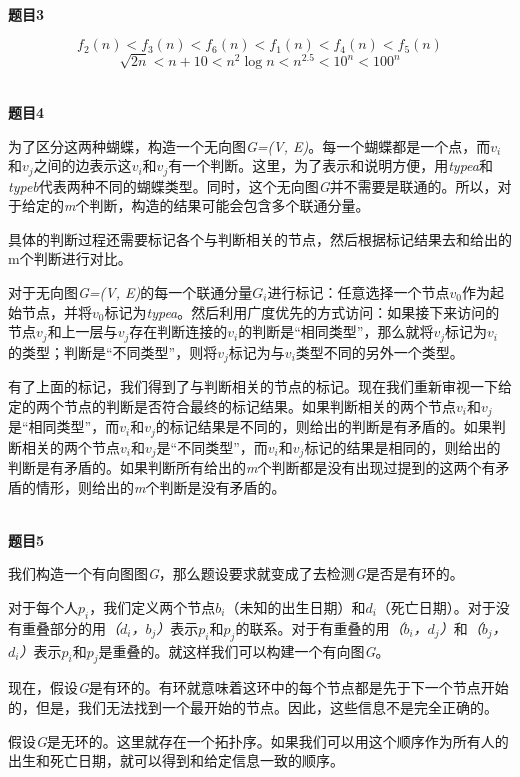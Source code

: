 \documentclass[a4paper,11pt,UTF8]{ctexart}
\begin{document}
\begin{spacing}{1.2}
~\\

\setlength{\parindent}{0em}
\textbf{\large{题目3}}
\setlength{\parindent}{2em}


$$f_2(n) < f_3(n) < f_6(n) < f_1(n) < f_4(n) < f_5(n)$$
$$ \sqrt{2n} < n + 10 < n^2 \log n < n^{2.5} < 10^n < 100^n $$


~\\
\setlength{\parindent}{0em}
\textbf{\large{题目4}}
\setlength{\parindent}{2em}

为了区分这两种蝴蝶，构造一个无向图\textit{G=(V, E)}。每一个蝴蝶都是一个点，而$v_i$和$v_j$之间的边表示这$v_i$和$v_j$有一个判断。这里，为了表示和说明方便，用\textit{typea}和\textit{typeb}代表两种不同的蝴蝶类型。同时，这个无向图\textit{G}并不需要是联通的。所以，对于给定的\textit{m}个判断，构造的结果可能会包含多个联通分量。

	具体的判断过程还需要标记各个与判断相关的节点，然后根据标记结果去和给出的m个判断进行对比。

	对于无向图\textit{G=(V, E)}的每一个联通分量$G_i$进行标记：任意选择一个节点$v_0$作为起始节点，并将$v_0$标记为\textit{typea}。然后利用广度优先的方式访问：如果接下来访问的节点$v_j$和上一层与$v_j$存在判断连接的$v_i$的判断是“相同类型”，那么就将$v_j$标记为$v_i$的类型；判断是“不同类型”，则将$v_j$标记为与$v_i$类型不同的另外一个类型。

	有了上面的标记，我们得到了与判断相关的节点的标记。现在我们重新审视一下给定的两个节点的判断是否符合最终的标记结果。如果判断相关的两个节点$v_i$和$v_j$是“相同类型”，而$v_i$和$v_j$的标记结果是不同的，则给出的判断是有矛盾的。如果判断相关的两个节点$v_i$和$v_j$是“不同类型”，而$v_i$和$v_j$标记的结果是相同的，则给出的判断是有矛盾的。如果判断所有给出的\textit{m}个判断都是没有出现过提到的这两个有矛盾的情形，则给出的\textit{m}个判断是没有矛盾的。



~\\

\setlength{\parindent}{0em}
\textbf{\large{题目5}}
\setlength{\parindent}{2em}

我们构造一个有向图图\textit{G}，那么题设要求就变成了去检测\textit{G}是否是有环的。

对于每个人$p_i$，我们定义两个节点$b_i$（未知的出生日期）和$d_i$（死亡日期）。对于没有重叠部分的用\textit{（$d_i$，$b_j$）}表示\textit{$p_i$}和\textit{$p_j$}的联系。对于有重叠的用\textit{（$b_i$，$d_j$）}和\textit{（$b_j$，$d_i$）}表示$p_i$和$p_j$是重叠的。就这样我们可以构建一个有向图\textit{G}。

现在，假设\textit{G}是有环的。有环就意味着这环中的每个节点都是先于下一个节点开始的，但是，我们无法找到一个最开始的节点。因此，这些信息不是完全正确的。

假设\textit{G}是无环的。这里就存在一个拓扑序。如果我们可以用这个顺序作为所有人的出生和死亡日期，就可以得到和给定信息一致的顺序。



\end{spacing}
\end{document}
